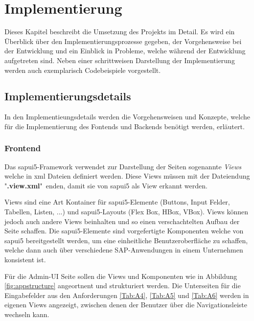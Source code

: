 \section{Implementierung}
Dieses Kapitel beschreibt die Umsetzung des Projekts im Detail. Es wird ein Überblick über den Implementierungsprozesse gegeben, der Vorgehensweise bei der Entwicklung und ein Einblick in Probleme, welche während der Entwicklung aufgetreten sind.
Neben einer schrittweisen Darstellung der Implementierung werden auch exemplarisch Codebeispiele vorgestellt.
\subsection[Implementierungsdetails]{Implementierungsdetails}
In den Implementieungsdetails werden die Vorgehensweisen und Konzepte, welche für die Implementierung des Fontends und Backends benötigt werden, erläutert.

\subsubsection[Frontend]{Frontend}
Das \gls{sapui5}-Framework verwendet zur Darstellung der Seiten sogenannte \textit{Views} welche in \gls{xml} Dateien definiert werden.
Diese Views müssen mit der Dateiendung "\textbf{.view.xml}"\ enden, damit sie von \gls{sapui5} als View erkannt werden.

Views sind eine Art Kontainer für \gls{sapui5}-Elemente (Buttons, Input Felder, Tabellen, Listen, ...) und \gls{sapui5}-Layouts (Flex Box, HBox, VBox).
Views können jedoch auch andere Views beinhalten und so einen verschachtelten Aufbau der Seite schaffen.
Die \gls{sapui5}-Elemente sind vorgefertigte Komponenten welche von \gls{sapui5} bereitgestellt werden, um eine einheitliche Benutzeroberfläche zu schaffen, welche dann auch über verschiedene SAP-Anwendungen in einem Unternehmen konsistent ist.

Für die Admin-UI Seite sollen die Views und Komponenten wie in Abbildung \ref{fig:appstructure} angeortnent und strukturiert werden.
Die Unterseiten für die Eingabefelder aus den Anforderungen \ref{Tab:A4}, \ref{Tab:A5} und \ref{Tab:A6} werden in eigenen Views angezeigt, zwischen denen der Benutzer über die Navigationsleiste wechseln kann.

